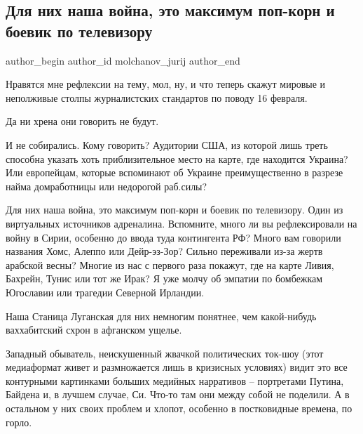  
 
 
 
 
 
\subsection{Для них наша война, это максимум поп-корн и боевик по телевизору}
\label{sec:17_02_2022.fb.molchanov_jurij.1.nasha_vojna_pop_korn}
 
\ifcmt
 author_begin
   author_id molchanov_jurij
 author_end
\fi

Нравятся мне рефлексии на тему, мол, ну, и что теперь скажут мировые и
неполживые столпы журналистских стандартов по поводу 16 февраля.

Да ни хрена они говорить не будут. 

И не собирались. Кому говорить? Аудитории США, из которой лишь треть способна
указать хоть приблизительное место на карте, где находится Украина? Или
европейцам, которые вспоминают об Украине преимущественно в разрезе найма
домработницы или недорогой раб.силы?

Для них наша война, это максимум поп-корн и боевик по телевизору. Один из
виртуальных источников адреналина. Вспомните, много ли вы рефлексировали на
войну в Сирии, особенно до ввода туда контингента РФ? Много вам говорили
названия Хомс, Алеппо или Дейр-эз-Зор? Сильно переживали из-за жертв арабской
весны? Многие из нас с первого раза покажут, где на карте Ливия, Бахрейн, Тунис
или тот же Ирак? Я уже молчу об эмпатии по бомбежкам Югославии или трагедии
Северной Ирландии.

Наша Станица Луганская для них немногим понятнее, чем какой-нибудь ваххабитский
схрон в афганском ущелье.

Западный обыватель, неискушенный жвачкой политических ток-шоу (этот медиаформат
живет и размножается лишь в кризисных условиях) видит это все контурными
картинками больших медийных нарративов – портретами Путина, Байдена и, в лучшем
случае, Си. Что-то там они между собой не поделили. А в остальном у них своих
проблем и хлопот, особенно в постковидные времена, по горло.

